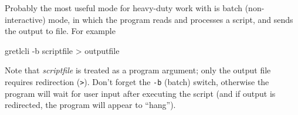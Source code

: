 Probably the most useful mode for heavy-duty work with 
is batch (non-interactive) mode, in which the program reads and
processes a script, and sends the output to file.  For example
\begin{code}
gretlcli -b scriptfile > outputfile
\end{code}

Note that \textsl{scriptfile} is treated as a program argument; only
the output file requires redirection (\verb|>|).  Don't forget the
\texttt{-b} (batch) switch, otherwise the program will wait for user
input after executing the script (and if output is redirected, the
program will appear to ``hang'').

    

